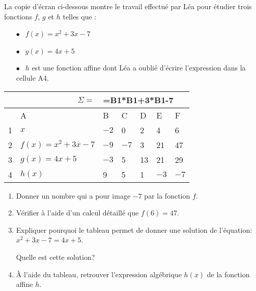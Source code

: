 
\medskip
 
La copie d'écran ci-dessous montre le travail effectué par Léa pour étudier trois fonctions $f$, $g$ et $h$ telles 
que :

\setlength\parindent{5mm}
\begin{itemize}
\item[$\bullet~~$] $f(x) =x^2+ 3x - 7$ 
\item[$\bullet~~$] $g(x) = 4x + 5$
\item[$\bullet~~$] $h$ est une fonction affine dont Léa a oublié d'écrire l'expression dans la cellule A4. 
\end{itemize}
\setlength\parindent{0mm}

\begin{center}
\begin{tabularx}{\linewidth}{|c|m{3cm}|*{5}{X|}}\hline
\multicolumn{2}{|r|}{$\Sigma =$}&\multicolumn{5}{l|}{=B1*B1+3*B1-7}\\ \hline 
	&A	&B	&C	&D	&E	&F\\ \hline
1	&$x$&$- 2$&0&2&4&6\\ \hline
2	&$f(x) = x^2 + 3x - 7$&$- 9$&$- 7$&3&21&47 \\ \hline
3	&$g(x) = 4x + 5$&$- 3$&5&13&21&29\\ \hline
4	&$h(x)$	&9	&5	&1	&$- 3$	&$- 7$\\ \hline
\end{tabularx}
\end{center}

\begin{enumerate}
\item Donner un nombre qui a pour image $- 7$ par la fonction $f$. 
\item Vérifier à l'aide d'un calcul détaillé que $f(6) = 47$. 
\item Expliquer pourquoi le tableau permet de donner une solution de l'équation: $x^2 + 3x - 7 = 4x + 5$.
 
Quelle est cette solution? 
\item À l'aide du tableau, retrouver l'expression algébrique $h(x)$ de la fonction affine $h$.
\end{enumerate}

\bigskip

